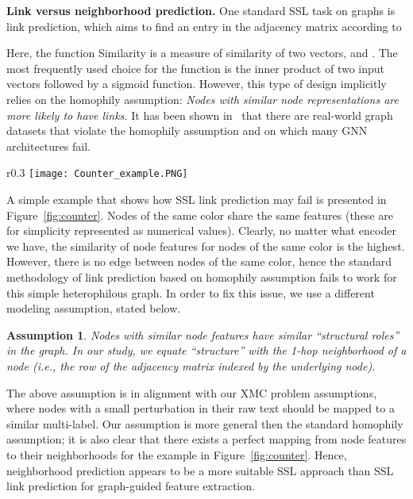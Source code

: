 \documentclass{article} \usepackage{iclr2022_conference,times}
\newtheorem{assumption}[theorem]{Assumption}
\begin{document}
\textbf{Link versus neighborhood prediction. }
One standard SSL task on graphs is link prediction, which aims to find an entry in the adjacency matrix according to

Here, the function Similarity is a measure of similarity of two vectors,  and . The most frequently used choice for the function is the inner product of two input vectors followed by a sigmoid function. However, this type of design implicitly relies on the homophily assumption: \emph{Nodes with similar node representations are more likely to have links.} It has been shown in~\cite{pei2020geom,chien2020adaptive,zhu2020beyond,lim2021new} that there are real-world graph datasets that violate the homophily assumption and on which many GNN architectures fail. 
\begin{wrapfigure}{r}{0.3\textwidth}
    \centering
    \vspace{-\intextsep}
    \texttt{[image: Counter\_example.PNG]}
    \vspace{-0.8cm}
  \caption{A counter-example for standard link prediction methodology.}
  \label{fig:counter}
  \vspace{-\intextsep}
\end{wrapfigure}
A simple example that shows how SSL link prediction may fail is presented in Figure~\ref{fig:counter}. Nodes of the same color share the same features (these are for simplicity represented as numerical values). Clearly, no matter what encoder  we have, the similarity of node features for nodes of the same color is the highest. However, there is no edge between nodes of the same color, hence the standard methodology of link prediction based on homophily assumption fails to work for this simple heterophilous graph. In order to fix this issue, we use a different modeling assumption, stated below.
\begin{assumption}\label{conj:1}
Nodes with similar node features have similar ``structural roles'' in the graph. In our study, we equate ``structure'' with the 1-hop neighborhood of a node (i.e., the row of the adjacency matrix indexed by the underlying node).
\end{assumption}
The above assumption is in alignment with our XMC problem assumptions, where nodes with a small perturbation in their raw text should be mapped to a similar multi-label. Our assumption is more general then the standard homophily assumption; it is also clear that there exists a perfect mapping from node features to their neighborhoods for the example in Figure~\ref{fig:counter}. Hence, neighborhood prediction appears to be a more suitable SSL approach than SSL link prediction for graph-guided feature extraction.
\end{document}
